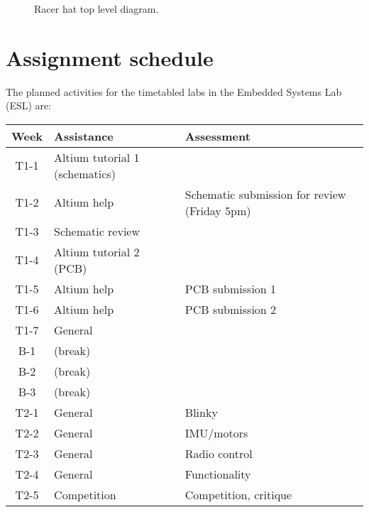 \documentclass[11pt, a4paper]{article}
\begin{document}

\begin{figure}[h]
  \centering
  
  \caption{Racer hat top level diagram.}
\end{figure}


\pagebreak

\section{Assignment schedule}

The planned activities for the timetabled labs in the Embedded Systems
Lab (ESL) are:
%
\begin{flushleft}
  \begin{tabular}{ c l l }
    Week            &  Assistance  &  Assessment \\
    \hline \hline
    T1-1 & Altium tutorial 1 (schematics)  & \\
    T1-2 & Altium help      & Schematic submission for review (Friday 5pm) \\
    T1-3 & Schematic review & \\
    T1-4 & Altium tutorial 2 (PCB) &          \\
    T1-5 & Altium help      & PCB submission 1    \\
    T1-6 & Altium help      & PCB submission 2    \\
    T1-7 & General          &                   \\
    \hline
    B-1  & (break)          &                   \\
    B-2  & (break)          &                   \\
    B-3  & (break)          &                   \\
    \hline
    T2-1 & General          & Blinky            \\
    T2-2 & General          & IMU/motors        \\
    T2-3 & General          & Radio control     \\
    T2-4 & General          & Functionality     \\
    T2-5 & Competition      & Competition, critique  \\
  \end{tabular}
\end{flushleft}
\end{document}

